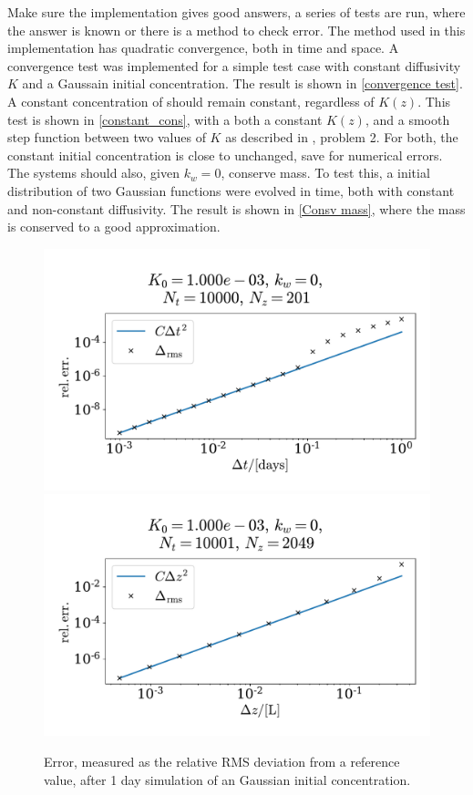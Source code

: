 \documentclass{article}
\begin{document}
    Make sure the implementation gives good answers, a series of tests are run, where the answer is known or there is a method to check error. The method used in this implementation has quadratic convergence, both in time and space. A convergence test was implemented for a simple test case with constant diffusivity $K$ and a Gaussain initial concentration. The result is shown in \autoref{convergence test}. A constant concentration of  should remain constant, regardless of $K(z)$. This test is shown in \autoref{constant_cons}, with a both a constant $K(z)$, and a smooth step function between two values of $K$ as described in \cite{exercise}, problem 2. For both, the constant initial concentration is close to unchanged, save for numerical errors. The systems should also, given $k_w=0$, conserve mass. To test this, a initial distribution of two Gaussian functions were evolved in time, both with constant and non-constant diffusivity. The result is shown in \autoref{Consv mass}, where the mass is conserved to a good approximation.
    
    
    \begin{figure}[H]
        \centering
        \includegraphics[width=.49\textwidth]{../plots/conv_test_t}
        \includegraphics[width=.49\textwidth]{../plots/conv_test_z}
        \caption{Error, measured as the relative RMS deviation from a reference value, after 1 day simulation of an Gaussian initial concentration.}
        \label{convergence test}
    \end{figure}
\end{document}

